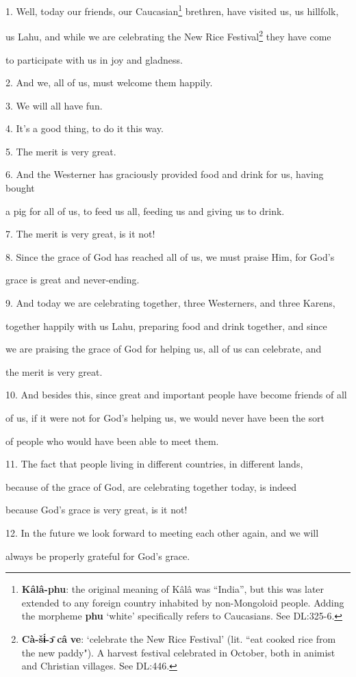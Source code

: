 \setcounter{footnote}{0}

1. Well, today our friends, our Caucasian\footnote{\textbf{Kâlâ-phu}: the original meaning of Kâlâ was ``India'', but this was later extended to any foreign country inhabited by non-Mongoloid people. Adding the morpheme \textbf{phu} `white' specifically refers to Caucasians. See DL:325-6.} brethren, have visited us, us hillfolk,


us Lahu, and while we are celebrating the New Rice Festival\footnote{\textbf{Cà-šɨ́-ɔ̄} \textbf{câ} \textbf{ve}: `celebrate the New Rice Festival' (lit. ``eat cooked rice from the new paddy"). A harvest festival celebrated in October, both in animist and Christian villages. See DL:446.} they have come

to participate with us in joy and gladness.

2. And we, all of us, must welcome them happily.

3. We will all have fun.

4. It's a good thing, to do it this way.

5. The merit is very great.

6. And the Westerner has graciously provided food and drink for us, having bought


a pig for all of us, to feed us all, feeding us and giving us to drink.

7. The merit is very great, is it not!

8. Since the grace of God has reached all of us, we must praise Him, for God's


grace is great and never-ending.

9. And today we are celebrating together, three Westerners, and three Karens,


together happily with us Lahu, preparing food and drink together, and since

we are praising the grace of God for helping us, all of us can celebrate, and


the merit is very great.

10. And besides this, since great and important people have become friends of all


of us, if it were not for God's helping us, we would never have been the sort


of people who would have been able to meet them.

11. The fact that people living in different countries, in different lands,


because of the grace of God, are celebrating together today, is indeed


because God's grace is very great, is it not!

12. In the future we look forward to meeting each other again, and we will


always be properly grateful for God's grace.

